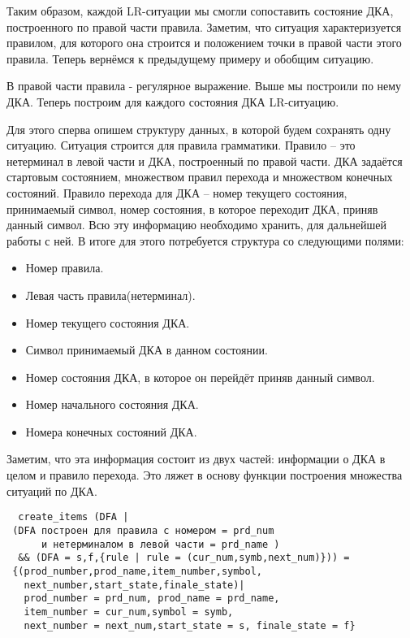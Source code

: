 Таким образом, каждой LR-ситуации мы смогли сопоставить состояние ДКА, построенного по правой части правила. Заметим, что ситуация характеризуется правилом, для которого она строится и положением точки в правой части этого правила. Теперь вернёмся к предыдущему примеру и обобщим ситуацию. 

В правой части правила - регулярное выражение. Выше мы построили по нему ДКА. Теперь построим для каждого состояния ДКА LR-ситуацию. 

Для этого сперва опишем структуру данных, в которой будем сохранять одну ситуацию. Ситуация строится для правила грамматики. Правило -- это нетерминал в левой части и ДКА, построенный по правой части. ДКА задаётся стартовым состоянием, множеством правил перехода и множеством конечных состояний. Правило перехода для ДКА -- номер текущего состояния, принимаемый символ, номер состояния, в которое переходит ДКА, приняв данный символ. Всю эту информацию необходимо хранить, для дальнейшей работы с ней. В итоге для этого потребуется структура со следующими полями:

\begin{itemize}
\item Номер правила.
\item Левая часть правила(нетерминал).
\item Номер текущего состояния ДКА.
\item Символ принимаемый ДКА в данном состоянии.  
\item Номер состояния ДКА, в которое он перейдёт приняв данный символ.
\item Номер начального состояния ДКА.
\item Номера конечных состояний ДКА.
\end{itemize}

Заметим, что эта информация состоит из двух частей: информации о ДКА в целом и правило перехода. Это ляжет в основу функции построения множества ситуаций по ДКА.

 \begin{verbatim} 
  create_items (DFA | 
 (DFA построен для правила с номером = prd_num
      и нетерминалом в левой части = prd_name )
  && (DFA = s,f,{rule | rule = (cur_num,symb,next_num)})) =
 {(prod_number,prod_name,item_number,symbol,
   next_number,start_state,finale_state)|
   prod_number = prd_num, prod_name = prd_name,
   item_number = cur_num,symbol = symb, 
   next_number = next_num,start_state = s, finale_state = f}
\end{verbatim}


